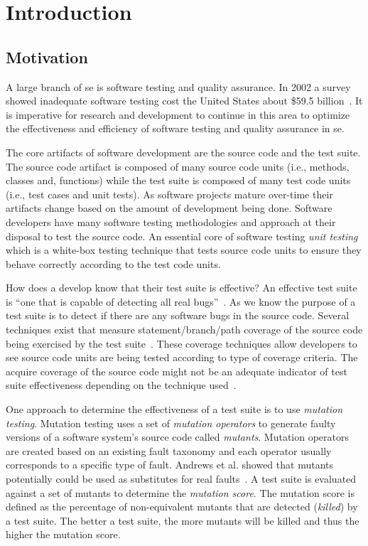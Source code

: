 \chapter{Introduction}
\label{chap:introduction}


\section{Motivation}
\label{sec:introduction_motivation}
A large branch of \gls{se} is software testing and quality assurance. In 2002 a survey showed inadequate software testing cost the United States about \$59.5 billion~\cite{RTI02}. It is imperative for research and development to continue in this area to optimize the effectiveness and efficiency of software testing and quality assurance in \gls{se}.

The core artifacts of software development are the source code and the test suite. The source code artifact is composed of many source code units (i.e., methods, classes and, functions) while the test suite is composed of many test code units (i.e., test cases and unit tests). As software projects mature over-time their artifacts change based on the amount of development being done. Software developers have many software testing methodologies and approach at their disposal to test the source code. An essential core of software testing \emph{unit testing} which is a white-box testing technique that tests source code units to ensure they behave correctly according to the test code units.

How does a develop know that their test suite is effective? An effective test suite is ``one that is capable of detecting all real bugs''~\cite{Wey93}. As we know the purpose of a test suite is to detect if there are any software bugs in the source code. Several techniques exist that measure statement/branch/path coverage of the source code being exercised by the test suite~\cite{ZHM97}. These coverage techniques allow developers to see source code units are being tested according to type of coverage criteria. The acquire coverage of the source code might not be an adequate indicator of test suite effectiveness depending on the technique used~\cite{NA09,GJ08}.

One approach to determine the effectiveness of a test suite is to use \emph{mutation testing}. Mutation testing uses a set of \emph{mutation operators} to generate faulty versions of a software system's source code called \emph{mutants}. Mutation operators are created based on an existing fault taxonomy and each operator usually corresponds to a specific type of fault. Andrews et al. showed that mutants potentially could be used as substitutes for real faults~\cite{ABLN06}. A test suite is evaluated against a set of mutants to determine the \emph{mutation score}. The mutation score is defined as the percentage of non-equivalent mutants that are detected (\emph{killed}) by a test suite. The better a test suite, the more mutants will be killed and thus the higher the mutation score.

